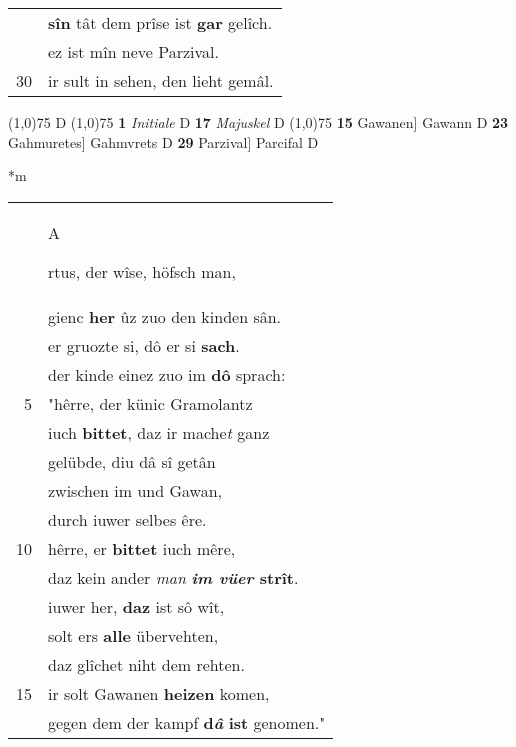 \documentclass[8pt,a4paper,notitlepage]{article}
\begin{document}
\begin{table}[ht]
\begin{minipage}[t]{0.5\linewidth}
\begin{tabular}{rl}
 & \textbf{sîn} tât dem prîse ist \textbf{gar} gelîch.\\ 
 & ez ist mîn neve Parzival.\\ 
30 & ir sult in sehen, den lieht gemâl.\\ 
\end{tabular}
\scriptsize
\line(1,0){75} \newline
D \newline
\line(1,0){75} \newline
\textbf{1} \textit{Initiale} D  \textbf{17} \textit{Majuskel} D  \newline
\line(1,0){75} \newline
\textbf{15} Gawanen] Gawann D \textbf{23} Gahmuretes] Gahmvrets D \textbf{29} Parzival] Parcifal D \newline
\end{minipage}
\hspace{0.5cm}
\begin{minipage}[t]{0.5\linewidth}
\small
\begin{center}*m
\end{center}
\begin{tabular}{rl}
 & \begin{large}A\end{large}rtus, der wîse, höfsch man,\\ 
 & gienc \textbf{her} ûz zuo den kinden sân.\\ 
 & er gruozte si, dô er si \textbf{sach}.\\ 
 & der kinde einez zuo im \textbf{dô} sprach:\\ 
5 & "hêrre, der künic Gramolantz\\ 
 & iuch \textbf{bittet}, daz ir mache\textit{t} ganz\\ 
 & gelübde, diu dâ sî getân\\ 
 & zwischen im und Gawan,\\ 
 & durch iuwer selbes êre.\\ 
10 & hêrre, er \textbf{bittet} iuch mêre,\\ 
 & daz kein ander \textit{man} \textbf{\textit{im vüer} strît}.\\ 
 & iuwer her, \textbf{daz} ist sô wît,\\ 
 & solt ers \textbf{alle} übervehten,\\ 
 & daz glîchet niht dem rehten.\\ 
15 & ir solt Gawanen \textbf{heizen} komen,\\ 
 & gegen dem der kampf \textbf{d\textit{â}} \textbf{ist} genomen."\\ 

\end{tabular}
\end{minipage}
\end{table}
\end{document}
